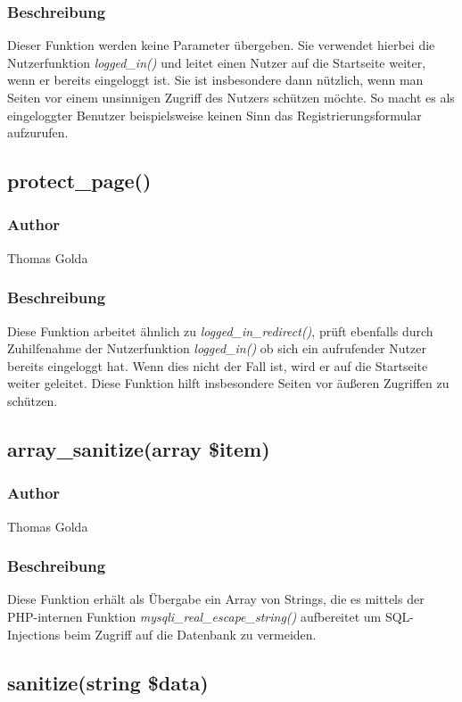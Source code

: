 \documentclass[fontsize = 12pt, paper = a4]{scrreprt}
\begin{document}
\subsubsection*{Beschreibung}
Dieser Funktion werden keine Parameter übergeben. Sie verwendet hierbei die Nutzerfunktion \textit{logged\_in()} und leitet einen Nutzer auf die Startseite weiter, wenn er bereits eingeloggt ist. Sie ist insbesondere dann nützlich, wenn man Seiten vor einem unsinnigen Zugriff des Nutzers schützen möchte. So macht es als eingeloggter Benutzer beispielsweise keinen Sinn das Registrierungsformular aufzurufen.


\subsection*{protect\_page()}
\subsubsection*{Author}
Thomas Golda
\subsubsection*{Beschreibung}
Diese Funktion arbeitet ähnlich zu \textit{logged\_in\_redirect()}, prüft ebenfalls durch Zuhilfenahme der Nutzerfunktion \textit{logged\_in()} ob sich ein aufrufender Nutzer bereits eingeloggt hat. Wenn dies nicht der Fall ist, wird er auf die Startseite weiter geleitet. Diese Funktion hilft insbesondere Seiten vor äußeren Zugriffen zu schützen.


\subsection*{array\_sanitize(array \$item)}
\subsubsection*{Author}
Thomas Golda
\subsubsection*{Beschreibung}
Diese Funktion erhält als Übergabe ein Array von Strings, die es mittels der PHP-internen Funktion \textit{mysqli\_real\_escape\_string()} aufbereitet um SQL-Injections beim Zugriff auf die Datenbank zu vermeiden.


\subsection*{sanitize(string \$data)}
\end{document}
